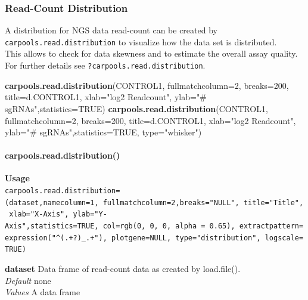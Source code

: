 \documentclass[]{article}
\newenvironment{Shaded}{\begin{snugshade}}{\end{snugshade}}
\newcommand{\KeywordTok}[1]{\textcolor[rgb]{0.13,0.29,0.53}{\textbf{{#1}}}}
\newcommand{\DataTypeTok}[1]{\textcolor[rgb]{0.13,0.29,0.53}{{#1}}}
\newcommand{\DecValTok}[1]{\textcolor[rgb]{0.00,0.00,0.81}{{#1}}}
\newcommand{\StringTok}[1]{\textcolor[rgb]{0.31,0.60,0.02}{{#1}}}
\newcommand{\OtherTok}[1]{\textcolor[rgb]{0.56,0.35,0.01}{{#1}}}
\newcommand{\NormalTok}[1]{{#1}}
\let\oldparagraph\paragraph
\renewcommand{\paragraph}[1]{\oldparagraph{#1}\mbox{}}
\begin{document}
\subsubsection{Read-Count Distribution}\label{read-count-distribution}

A distribution for NGS data read-count can be created by
\texttt{carpools.read.distribution} to visualize how the data set is
distributed.\\
This allows to check for data skewness and to estimate the overall assay
quality.\\
For further details see \texttt{?carpools.read.distribution}.

\begin{Shaded}
\begin{Highlighting}[]
\KeywordTok{carpools.read.distribution}\NormalTok{(CONTROL1, }\DataTypeTok{fullmatchcolumn=}\DecValTok{2}\NormalTok{, }\DataTypeTok{breaks=}\DecValTok{200}\NormalTok{,}
  \DataTypeTok{title=}\NormalTok{d.CONTROL1, }\DataTypeTok{xlab=}\StringTok{"log2 Readcount"}\NormalTok{, }\DataTypeTok{ylab=}\StringTok{"# sgRNAs"}\NormalTok{,}\DataTypeTok{statistics=}\OtherTok{TRUE}\NormalTok{) }
\KeywordTok{carpools.read.distribution}\NormalTok{(CONTROL1, }\DataTypeTok{fullmatchcolumn=}\DecValTok{2}\NormalTok{, }\DataTypeTok{breaks=}\DecValTok{200}\NormalTok{,}
  \DataTypeTok{title=}\NormalTok{d.CONTROL1, }\DataTypeTok{xlab=}\StringTok{"log2 Readcount"}\NormalTok{, }\DataTypeTok{ylab=}\StringTok{"# sgRNAs"}\NormalTok{,}\DataTypeTok{statistics=}\OtherTok{TRUE}\NormalTok{, }\DataTypeTok{type=}\StringTok{"whisker"}\NormalTok{) }
\end{Highlighting}
\end{Shaded}

\paragraph{carpools.read.distribution()}\label{carpools.read.distribution}

\textbf{Usage}\\
\texttt{carpools.read.distribution=(dataset,namecolumn=1,\ fullmatchcolumn=2,breaks="NULL",\ title="Title",\ xlab="X-Axis",\ ylab="Y-Axis",statistics=TRUE,\ col=rgb(0,\ 0,\ 0,\ alpha\ =\ 0.65),\ extractpattern=expression("\^{}(.+?)\_.+"),\ plotgene=NULL,\ type="distribution",\ logscale=TRUE)}

\textbf{dataset} Data frame of read-count data as created by
load.file().\\
\emph{Default} none\\
\emph{Values} A data frame
\end{document}
